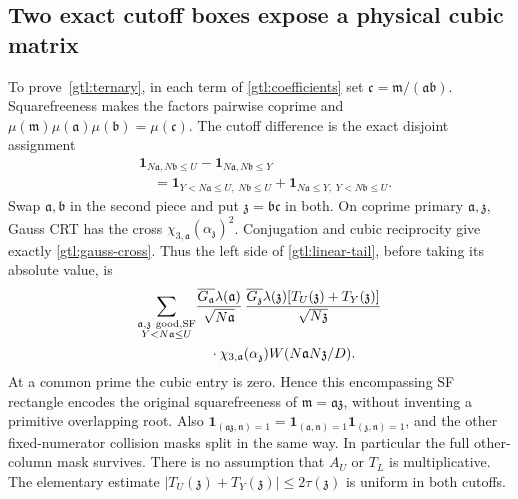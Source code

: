 \subsection{Two exact cutoff boxes expose a physical cubic matrix}
\label{gtl:grouping-proof}
To prove~\eqref{gtl:ternary}, in each term of
\eqref{gtl:coefficients} set
$\mathfrak c=\mathfrak m/(\mathfrak a\mathfrak b)$.
Squarefreeness makes the factors pairwise coprime and
$\mu(\mathfrak m)\mu(\mathfrak a)\mu(\mathfrak b)
 =\mu(\mathfrak c)$.
The cutoff difference is the exact disjoint assignment
\begin{equation}\label{gtl:two-boxes}
 \begin{aligned}
 &\mathbf1_{N\mathfrak a,N\mathfrak b\le U}
       -\mathbf1_{N\mathfrak a,N\mathfrak b\le Y}\\
 &\quad=\mathbf1_{Y<N\mathfrak a\le U,\;N\mathfrak b\le U}
       +\mathbf1_{N\mathfrak a\le Y,\;Y<N\mathfrak b\le U}.
 \end{aligned}
\end{equation}
Swap $\mathfrak a,\mathfrak b$ in the second piece and
put $\mathfrak z=\mathfrak b\mathfrak c$ in both.
On coprime primary $\mathfrak a,\mathfrak z$, Gauss CRT
has the cross
$\chi_{3,\mathfrak a}(\alpha_{\mathfrak z})^2$.
Conjugation and cubic reciprocity give exactly
\eqref{gtl:gauss-cross}. Thus the left side of
\eqref{gtl:linear-tail}, before taking its absolute value,
is
\begin{equation}\label{gtl:grouped-form}
 \begin{split}
 \sum_{\substack{\mathfrak a,\mathfrak z\ {\rm good,SF}\\
                         Y<N\mathfrak a\le U}}
 &\frac{\overline{G_{\mathfrak a}}\lambda(\mathfrak a)}
             {\sqrt{N\mathfrak a}}\,
   \frac{\overline{G_{\mathfrak z}}\lambda(\mathfrak z)
                         [T_U(\mathfrak z)+T_Y(\mathfrak z)]}
             {\sqrt{N\mathfrak z}}\\
 &\quad\cdot\chi_{3,\mathfrak a}(\alpha_{\mathfrak z})
                         W(N\mathfrak aN\mathfrak z/D).
 \end{split}
\end{equation}
At a common prime the cubic entry is zero. Hence this
encompassing SF rectangle encodes the original
squarefreeness of $\mathfrak m=\mathfrak a\mathfrak z$,
without inventing a primitive overlapping root.
Also
$\mathbf1_{(\mathfrak a\mathfrak z,\mathfrak n)=1}
 =\mathbf1_{(\mathfrak a,\mathfrak n)=1}
  \mathbf1_{(\mathfrak z,\mathfrak n)=1}$, and the other
fixed-numerator collision masks split in the same way.
In particular the full other-column mask survives.
There is no assumption that $A_U$ or $T_L$ is multiplicative.
The elementary estimate
$|T_U(\mathfrak z)+T_Y(\mathfrak z)|\le2\tau(\mathfrak z)$
is uniform in both cutoffs.

